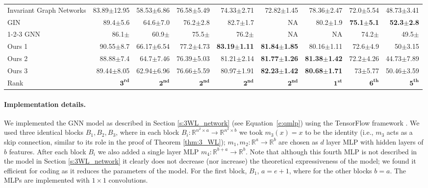 \documentclass{article}
\newcommand{\Real}{\mathbb R}
\newcommand{\too}{\rightarrow}
\newcommand{\ie}{{i.e.}}
\def\Eqref#1{Equation~\ref{#1}}
\begin{document}
\begin{table}[t]
{\begin{tabular}{@{\hskip8pt}l@{\hskip8pt}r@{\hskip8pt}r@{\hskip8pt}r@{\hskip8pt}r@{\hskip8pt}r@{\hskip8pt}r@{\hskip8pt}r@{\hskip8pt}r@{\hskip8pt}}
		
	Invariant Graph Networks \citep{maron2018invariant}  & 83.89$\pm$12.95     & 58.53$\pm$6.86     &  76.58$\pm$5.49     & 74.33$\pm$2.71     & 72.82$\pm$1.45     & 78.36$\pm$2.47  & 72.0$\pm$5.54   & 48.73$\pm$3.41 \\
		GIN  \citep{xu2018how}& 89.4$\pm$5.6     & 64.6$\pm$7.0     &  76.2$\pm$2.8     & 82.7$\pm$1.7     & NA     & 80.2$\pm$1.9  & \bf{75.1$\pm$5.1} & \bf{52.3$\pm$2.8} \\
		1-2-3 GNN \citep{morris2018weisfeiler} & 86.1$\pm$    & 60.9$\pm$     &  75.5$\pm$     & 76.2$\pm$     & NA     & NA  & 74.2$\pm$ & 49.5$\pm$ \\
Ours 1  & 90.55$\pm$8.7     & 66.17$\pm$6.54     &  77.2$\pm$4.73     &  \bf{83.19$\pm$1.11}  & \bf{81.84$\pm$1.85}     & 80.16$\pm$1.11  & 72.6$\pm$4.9 & 50$\pm$3.15 \\
		Ours 2  & 88.88$\pm$7.4  &  64.7$\pm$7.46  &  76.39$\pm$5.03  &  81.21$\pm$2.14  &  \bf{81.77$\pm$1.26}  &  \bf{81.38$\pm$1.42}  &  72.2$\pm$4.26  &  44.73$\pm$7.89  \\
		Ours 3  & 89.44$\pm$8.05  &  62.94$\pm$6.96  &  76.66$\pm$5.59  &  80.97$\pm$1.91  &  \bf{82.23$\pm$1.42}  &  \bf{80.68$\pm$1.71}  &  73$\pm$5.77  &  50.46$\pm$3.59   \\
		Rank & $\mathbf{3^{rd}}$ & $\mathbf{2^{nd}}$ & $\mathbf{2^{nd}}$ & $\mathbf{2^{nd}}$ & $\mathbf{2^{nd}}$ & $\mathbf{1^{st}}$ & $\mathbf{6^{th}}$ & $\mathbf{5^{th}}$ \\
		\bottomrule
	\end{tabular}}
	\label{tab:class_res}\vspace{-10pt}
\end{table}\paragraph{Implementation details.} We implemented the GNN model as described in Section \ref{s:3WL_network} (see \Eqref{e:qmlp}) using the TensorFlow framework \citep{abadi2016tensorflow}. We used three identical blocks $B_1,B_2,B_3$, where in each block $B_i:\Real^{n^2\times a} \too \Real^{n^2\times b}$ we took $m_3(x)=x$ to be the identity (\ie, $m_3$ acts as a skip connection, similar to its role in the proof of Theorem \ref{thm:3_WL}); $m_1,m_2:\Real^a \too \Real^b$ are chosen as $d$ layer MLP with hidden layers of $b$ features. After each block $B_i$ we also added a single layer MLP $m_4:\Real^{b+a}\too \Real^b$. Note that although this fourth MLP is not described in the model in Section \ref{s:3WL_network} it clearly does not decrease (nor increase) the theoretical expressiveness of the model; we found it efficient for coding as it reduces the parameters of the model. For the first block, $B_1$, $a=e+1$, where for the other blocks $b=a$. The MLPs are implemented with $1\times 1$ convolutions.
\end{document}
